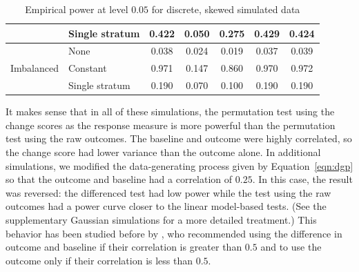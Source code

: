 \documentclass[12pt]{article}
\begin{document}
\begin{table}[]
\begin{tabular}{ll|ccccc}
                            & Single stratum                                              & 0.422                      & 0.050                                                                                & 0.275                                                                                 & 0.429                                                                        & 0.424                                                                        \\ \hline
\multirow{3}{*}{Imbalanced} & None                                                        & 0.038                      & 0.024                                                                                & 0.019                                                                                 & 0.037                                                                        & 0.039                                                                        \\
                            & Constant                                                    & 0.971                      & 0.147                                                                                & 0.860                                                                                 & 0.970                                                                        & 0.972                                                                        \\
                            & Single stratum                                              & 0.190                      & 0.070                                                                                & 0.100                                                                                 & 0.190                                                                        & 0.190                                                                        \\ \hline
\end{tabular}
\caption{Empirical power at level $0.05$ for discrete, skewed simulated data} 
\label{tab:skewed_power}
\end{table}
It makes sense that in all of these simulations, the permutation test using the change scores as the response measure is more powerful than the permutation test using the raw outcomes.
The baseline and outcome were highly correlated, so the change score had lower variance than the outcome alone. 
In additional simulations, 
we modified the data-generating process given by Equation~\ref{eqn:dgp} so that the outcome and baseline had a correlation of $0.25$.
In this case, the result was reversed: 
the differenced test had low power while the test using the raw outcomes had a power curve closer to the linear model-based tests.
(See the supplementary Gaussian simulations for a more detailed treatment.)
This behavior has been studied before by \cite{frison_repeated_1992}, who recommended using the difference in outcome and baseline if their correlation is greater than $0.5$ and to use the outcome only if their correlation is less than $0.5$.
\end{document}
